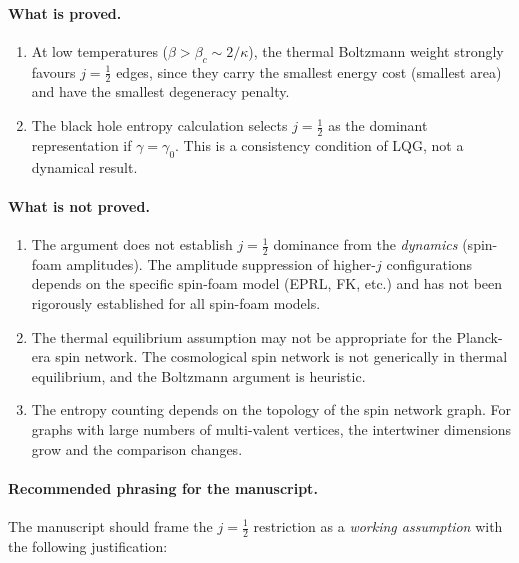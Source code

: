 \documentclass[11pt,a4paper]{article}
\theoremstyle{definition}
\begin{document}
\paragraph{What is proved.}
\begin{enumerate}
  \item At low temperatures ($\beta > \beta_c\sim 2/\kappa$), the thermal
    Boltzmann weight strongly favours $j=\tfrac{1}{2}$ edges, since they
    carry the smallest energy cost (smallest area) and have the smallest
    degeneracy penalty.
  \item The black hole entropy calculation selects $j=\tfrac{1}{2}$ as
    the dominant representation if $\gamma = \gamma_0$.  This is a
    consistency condition of LQG, not a dynamical result.
\end{enumerate}

\paragraph{What is not proved.}
\begin{enumerate}
  \item The argument does not establish $j=\tfrac{1}{2}$ dominance from
    the \emph{dynamics} (spin-foam amplitudes).  The amplitude suppression
    of higher-$j$ configurations depends on the specific spin-foam model
    (EPRL, FK, etc.) and has not been rigorously established for all
    spin-foam models.
  \item The thermal equilibrium assumption may not be appropriate for the
    Planck-era spin network.  The cosmological spin network is not
    generically in thermal equilibrium, and the Boltzmann argument is
    heuristic.
  \item The entropy counting depends on the topology of the spin network
    graph.  For graphs with large numbers of multi-valent vertices, the
    intertwiner dimensions grow and the comparison changes.
\end{enumerate}

\paragraph{Recommended phrasing for the manuscript.}
The manuscript should frame the $j=\tfrac{1}{2}$ restriction as a
\emph{working assumption} with the following justification:
\end{document}
